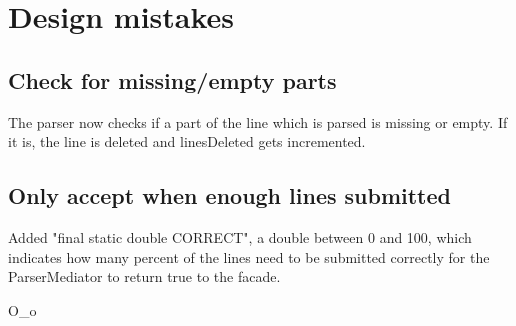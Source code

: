 \section{Design mistakes}

\subsection{Check for missing/empty parts}
The parser now checks if a part of the line which is parsed is missing or empty. If it is, the line is deleted and 
linesDeleted gets incremented.

\subsection{Only accept when enough lines submitted}
Added "final static double CORRECT", a double between 0 and 100, which indicates how many percent of the lines need to be
submitted correctly for the ParserMediator to return true to the facade.

O\_o
